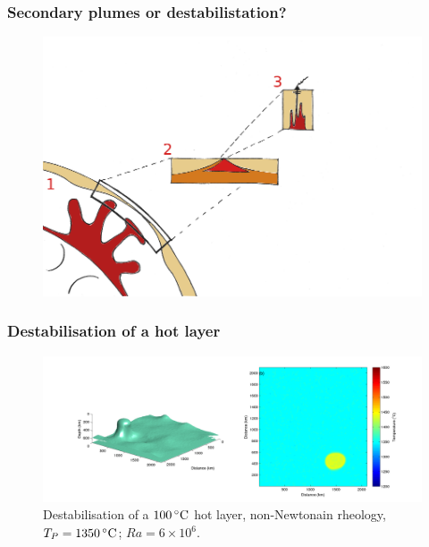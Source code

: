 \documentclass[aspectratio=169]{beamer}
\begin{document}
\begin{frame}
    \frametitle{Secondary plumes or destabilistation?}
    \begin{figure}
        \includegraphics[height=0.9\paperheight]{./pictures/drawing.png}
    \end{figure}
\end{frame}

\begin{frame}
    \frametitle{Destabilisation of a hot layer}
    \begin{figure}
        \vspace{-.5cm}
        \includegraphics[width=0.85\paperwidth]{./figures/100hot/100hotbase_1.png}
        \caption{Destabilisation of a $100\rm\,^{\circ}C$ hot layer, non-Newtonain rheology, $T_{P}=1350\rm\,^{\circ}C$; $Ra = 6\times10^{6}$.}
    \end{figure}
\end{frame}
\end{document}
